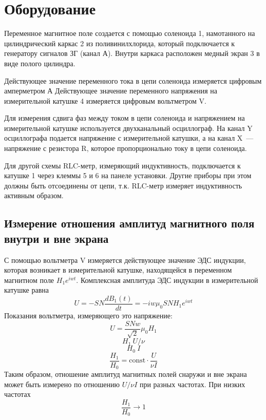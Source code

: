 \section{Оборудование}
Переменное магнитное поле создается с помощью соленоида 1, намотанного на цилиндрический каркас 2 из поливинилхлорида, который подключается к генератору сигналов ЗГ (канал А).
Внутри каркаса расположен медный экран 3 в виде полого цилиндра.

Действующее значение переменного тока в цепи соленоида измеряется цифровым амперметром А
Действующее значение переменного напряжения на измерительной катушке 4  измеряется цифровым вольтметром V.

Для измерения сдвига фаз между током в цепи соленоида и напряжением на измерительной катушке используется двухканальный осциллограф.
На канал Y  осциллографа подается напряжение с измерительной катушки, а на канал X~--- напряжение с резистора R, которое пропорционально току в цепи соленоида.

Для другой схемы RLC-метр, измеряющий индуктивность,
подключается к катушке 1 через клеммы 5 и 6 на панеле установки. Другие приборы при
этом должны быть отсоединены от цепи, т.к. RLC-метр измеряет индуктивность активным
образом.

\begin{figure}[ht!]
\end{figure}

\subsection{Измерение отношения амплитуд магнитного поля внутри и вне экрана}
С помощью вольтметра V измеряется действующее значение ЭДС индукции, которая
возникает в измерительной катушке, находящейся в переменном магнитном поле
$H_{1}e^{iwt}$. Комплексная амплитуда ЭДС индукции в измерительной катушке равна
\[
U = -SN\frac{dB_{1}(t)}{dt} = -iw\mu_{0}SNH_{1}e^{iwt}
\]
Показания вольтметра, измеряющего это напряжение:
\[
    U=\frac{SNw}{\sqrt{2}}\mu_{0}H_{1}
\]
\[
    H_{1} ~ U/\nu
\]
\[
    H_{0} ~ I
\]
\[
    \frac{H_{1}}{H_{0}} = \text{const}\cdot \frac{U}{\nu I}
\]
Таким образом, отношение амплитуд магнитных полей снаружи и вне экрана
может быть измерено по отношению $U/\nu I$ при разных частотах.
При низких частотах
\[
    \frac{H_{1}}{H_{0}}\to 1
\]

